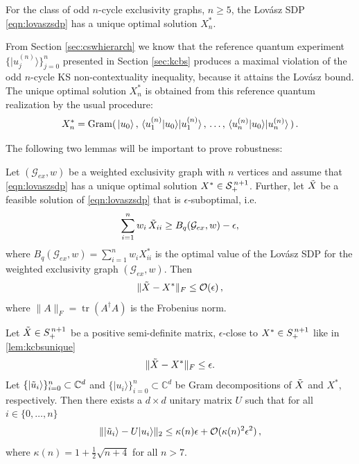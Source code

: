 \begin{lemma}
\label{lem:kcbsunique}
For the class of odd $n$-cycle exclusivity graphs, $n\geq5$, the Lovász SDP \ref{eqn:lovaszsdp} has a unique optimal solution $X^*_n$.   
\end{lemma}

From Section \ref{sec:cswhierarch} we know that the reference quantum experiment $\{\vert u_j^{(n)} \rangle \}_{j=0}^{n}$ presented in Section \ref{sec:kcbs} produces a maximal violation of the odd $n$-cycle KS non-contextuality inequality, because it attains the Lovász bound. The unique optimal solution $X^*_n$ is obtained from this reference quantum realization by the usual procedure:
\begin{equation*}
    X^*_n=\operatorname{Gram}(\thinspace\vert u_0 \rangle\thinspace,\thinspace \langle u_1^{(n)} \vert u_0 \rangle \vert u_1^{(n)} \rangle\thinspace,\thinspace\dots,\thinspace \langle u_n^{(n)} \vert u_0 \rangle \vert u_n^{(n)} \rangle\thinspace)\thinspace.
\end{equation*}

The following two lemmas will be important to prove robustness:

\begin{lemma}
\label{lem:epssuboptgram}
Let $(\mathcal{G}_{ex},w)$ be a weighted exclusivity graph with $n$ vertices and assume that \ref{eqn:lovaszsdp} has a unique optimal solution $X^*\in \mathcal{S}_+^{\thinspace n+1}$. Further, let $\Tilde{X}$ be a feasible solution of \ref{eqn:lovaszsdp} that is $\epsilon$-suboptimal, i.e.\
\begin{equation*}
    \sum_{i=1}^n w_i\thinspace\Tilde{X}_{ii} \geq B_{q}(\mathcal{G}_{ex},w)-\epsilon,
\end{equation*}
where $B_{q}(\mathcal{G}_{ex},w)=\sum_{i=1}^n w_i X_{ii}^*$ is the optimal value of the Lovász SDP for the weighted exclusivity graph $(\mathcal{G}_{ex},w)$.
Then
\begin{equation*}
\|\Tilde{X}-X^*\|_F \leq \mathcal{O}(\epsilon)\,,
\end{equation*}
where $\|A\|_F=\operatorname{tr}(A^{\dag}A)$ is the Frobenius norm.
\end{lemma}

\begin{lemma}
\label{lem:closegramdecomp}
Let $\Tilde{X}\in S_{+}^{\thinspace n+1}$ be a positive semi-definite matrix, $\epsilon$-close to $X^*\in S_{+}^{\thinspace n+1}$ like in \ref{lem:kcbsunique}
\begin{equation*}
\|\Tilde{X}-X^*\|_F \leq \epsilon.
\end{equation*}
Let $\{\vert \Tilde{u}_i \rangle\}_{i=0}^n\subset\mathbb{C}^{d}$ and $\{\vert u_i\rangle\}_{i=0}^n\subset\mathbb{C}^{d}$ be Gram decompositions of $\Tilde{X}$ and $X^*$, respectively. Then there exists a $d\times d$ unitary matrix $U$ such that for all $i\in\{0,\dots,n\}$
\begin{equation*}
    \|\vert \Tilde{u}_i\rangle - U \vert u_i\rangle\|_2 \leq \kappa(n)\epsilon + \mathcal{O}(\kappa(n)^2\epsilon^2)\,,
\end{equation*}
where $\kappa(n)=1+\frac{1}{2}\sqrt{n+4}$ for all $n>7$.
\end{lemma}


